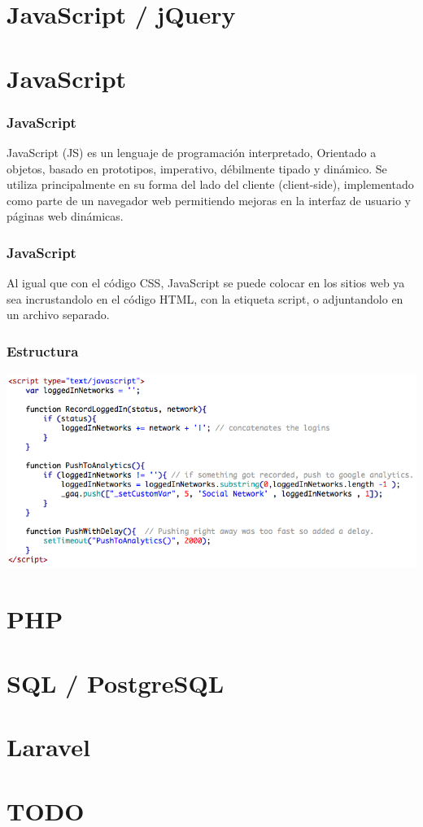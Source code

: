 \documentclass[12pt]{beamer}
\begin{document}
\section{JavaScript / jQuery}

\section{JavaScript}

\begin{frame}
 \frametitle{JavaScript}
 JavaScript (JS) es un lenguaje de programación interpretado, Orientado a objetos, basado en prototipos, imperativo, débilmente tipado y dinámico.
 \newline
 Se utiliza principalmente en su forma del lado del cliente (client-side), implementado como parte de un navegador web permitiendo mejoras en la interfaz de usuario y páginas web dinámicas.
\end{frame}

\begin{frame}
 \frametitle{JavaScript}
 Al igual que con el código CSS, JavaScript se puede colocar en los sitios web ya sea incrustandolo en el código HTML, con la etiqueta script, o adjuntandolo en un archivo separado.
\end{frame}

\begin{frame}
 \frametitle{Estructura}
 \begin{center}
    \includegraphics[scale=0.35]{img/js.png}
 \end{center}
\end{frame}


\section{PHP}

\section{SQL / PostgreSQL}

\section{Laravel}

\section{TODO}

\end{document}
